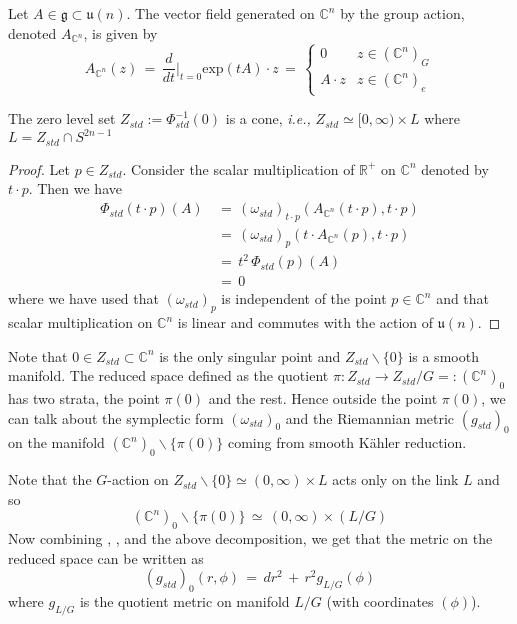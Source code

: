 \documentclass[a4paper,12pt]{article}
\newcommand{\C}{\mathbb{C}}
\newcommand{\R}{\mathbb{R}}
\newcommand{\inv}[1]{#1^{-1}}
\begin{document}
	
	Let $A\in \mathfrak{g} \subset \mathfrak{u}(n)$. The vector field generated on $\C^n$ by the group action, denoted $A_{\C^n}$, is given by
	\begin{equation}\label{vecfield}
		A_{\C^n}(z) \,=\, \frac{d}{dt}\Bigr|_{t=0} \text{exp}(tA)\cdot z \,=\, \begin{cases}
			0 & \text{$z \in (\C^n)_G$} \\
			A \cdot z & \text{$z \in (\C^n)_{e}$}
		\end{cases}
\end{equation}
	
	
	
	\begin{lemma}\label{conelemma}
		The zero level set $Z_{std}:=\inv{\Phi_{std}}(0)$ is a cone,  \textit{i.e.,} $Z_{std} \simeq [0,\infty) \times L$ where $L=Z_{std}\cap S^{2n-1}$
	\end{lemma} 
	\begin{proof}
		Let $p\in Z_{std}$. Consider the scalar multiplication of $\R^+$ on $\C^n$ denoted by $t\cdot p$. Then we have
		\begin{equation*}
			\begin{split}
				\Phi_{std}(t\cdot p) (A) \,&=\, (\omega_{std})_{t\cdot p}(A_{\C^n}(t\cdot p), t\cdot p) \\
				&=\,  (\omega_{std})_p(t \cdot A_{\C^n}(p), t\cdot p)\\
				&=\, t^2 \, \Phi_{std}(p)(A)\\
				&=\, 0
			\end{split}
		\end{equation*}
		where we have used that $(\omega_{std})_{p}$ is independent of the point $p\in \C^n$ and that scalar multiplication on $\C^n$ is linear and commutes with the action of $\mathfrak{u}(n)$.
	\end{proof}
	
	Note that $0\in Z_{std} \subset \C^n$ is the only singular point and $Z_{std}\backslash\{0\}$ is a smooth manifold. The reduced space defined as the quotient $\pi:Z_{std} \to Z_{std}/G=:(\C^n)_0$ has two strata, the point $\pi(0)$ and the rest. Hence outside the point $\pi(0)$, we can talk about the symplectic form $(\omega_{std})_0$ and the Riemannian metric $(g_{std})_0$ on the manifold $(\C^n)_0\backslash\{\pi(0)\}$ coming from smooth K\"ahler reduction. 
	
	Note that the $G$-action on $Z_{std}\backslash\{0\} \simeq (0,\infty) \times L$ acts only on the link $L$ and so 
	\begin{equation}
		(\C^n)_0\backslash\{\pi(0)\} \,\simeq\, (0,\infty) \times (L/G)
	\end{equation}
	Now combining , , and the above decomposition, we get that the metric on the reduced space can be written as
	\begin{equation}\label{standardquotientmetric}
		(g_{std})_0(r,\phi) \,=\, dr^2 \,+\, r^2 g_{L/G}(\phi)
	\end{equation}
	where $g_{L/G}$ is the quotient metric on manifold $L/G$ (with coordinates $(\phi)$).
	
\end{document}
